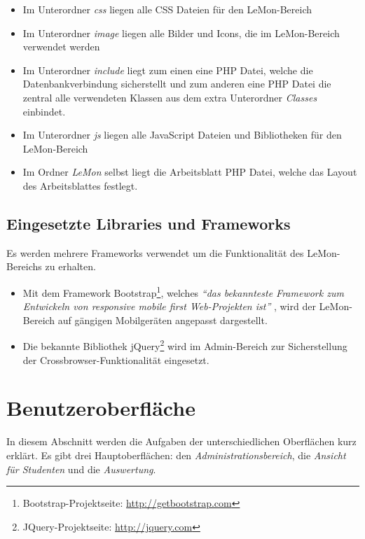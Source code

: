 \begin{singlespacing}
	\begin{itemize}
		\item Im Unterordner \emph{css} liegen alle CSS Dateien für den \gls{LeMon}-Bereich
		\item Im Unterordner \emph{image} liegen alle Bilder und Icons, die im
			\gls{LeMon}-Bereich verwendet werden
		\item Im Unterordner \emph{include} liegt zum einen eine PHP Datei, welche die
			Datenbankverbindung sicherstellt und zum anderen eine PHP Datei die zentral alle
			verwendeten Klassen aus dem extra Unterordner \emph{Classes} einbindet.
		\item Im Unterordner \emph{js} liegen alle \gls{JavaScript} Dateien und Bibliotheken für den
			\gls{LeMon}-Bereich
		\item Im Ordner \emph{LeMon} selbst liegt die Arbeitsblatt \gls{PHP} Datei, welche das Layout des Arbeitsblattes festlegt.
	\end{itemize}
\end{singlespacing}


\subsection{Eingesetzte Libraries und Frameworks}
Es werden mehrere Frameworks verwendet um die Funktionalität des LeMon-Bereichs
zu erhalten.
\begin{singlespacing}
	\begin{itemize}
		\item Mit dem Framework \gls{Bootstrap}\footnote{Bootstrap-Projektseite:
			\url{http://getbootstrap.com}}, welches \emph{"`das bekannteste Framework zum Entwickeln
			von responsive mobile first Web-Projekten ist"'} \cite{BootstrapDefinition}, wird
			der LeMon-Bereich auf gängigen Mobilgeräten angepasst dargestellt.
		\item Die bekannte Bibliothek \gls{jQuery}\footnote{JQuery-Projektseite:
			\url{http://jquery.com}} wird im Admin-Bereich zur Sicherstellung der
			Crossbrowser-Funktionalität eingesetzt.
	\end{itemize}
\end{singlespacing}

\section{Benutzeroberfläche}
In diesem Abschnitt werden die Aufgaben der unterschiedlichen Oberflächen kurz
erklärt. Es gibt drei Hauptoberflächen: den \emph{Administrationsbereich}, die
\emph{Ansicht für Studenten} und die \emph{Auswertung}.

